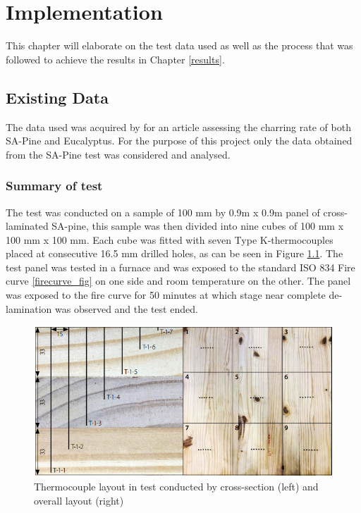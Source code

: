 \chapter{Implementation} \label{implementation}
This chapter will elaborate on the test data used as well as the process that was followed to achieve the results in Chapter \ref{results}.
\section{Existing Data}
The data used was acquired by \cite{Westhuyzen:2020} for an article assessing the charring rate of both SA-Pine and Eucalyptus.
	For the purpose of this project only the data obtained from the SA-Pine test was considered and analysed. 
	\subsection{Summary of test}
	The test was conducted on a sample of 100 mm by 0.9m x 0.9m panel of cross-laminated SA-pine, this sample was then divided into nine cubes of 100 mm x 100 mm x 100 mm.
	Each cube was fitted with seven Type K-thermocouples placed at consecutive 16.5 mm drilled holes, as can be seen in Figure \ref{TC_layout}. 
	The test panel was tested in a furnace and was exposed to the standard ISO 834 Fire curve \ref{firecurve_fig} on one side and room temperature on the other. 
	The panel was exposed to the fire curve for 50 minutes at which stage near complete de-lamination was observed and the test ended.
	\begin{figure}[H]
	\centering
	\includegraphics[width=0.75\linewidth]{figures/TC_layout.png}
	\caption{Thermocouple layout in test conducted by \cite{Westhuyzen:2020} cross-section (left) and overall layout (right)}
	\label{TC_layout}
	\end{figure}
	
